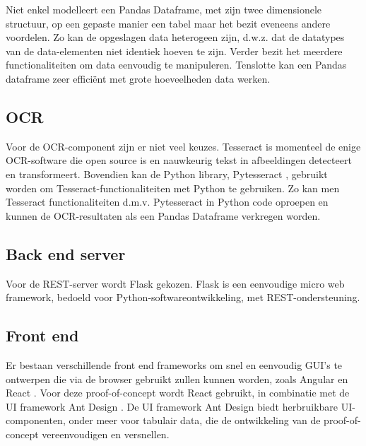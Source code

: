 Niet enkel modelleert een Pandas Dataframe, met zijn twee dimensionele structuur, op een gepaste manier een tabel maar het bezit eveneens andere voordelen. Zo kan de opgeslagen data heterogeen zijn, d.w.z. dat de datatypes van de data-elementen niet identiek hoeven te zijn. Verder bezit het meerdere functionaliteiten om data eenvoudig te manipuleren. Tenslotte kan een Pandas dataframe zeer efficiënt met grote hoeveelheden data werken.

\subsection{\Gls{OCR}}

Voor de \Gls{OCR}-component zijn er niet veel keuzes. Tesseract \autocite{Kay2007} is momenteel de enige \Gls{OCR}-software die open source is en nauwkeurig tekst in afbeeldingen detecteert en transformeert. Bovendien kan de Python library, Pytesseract \autocite{Lee2009}, gebruikt worden om Tesseract-functionaliteiten met Python te gebruiken. Zo kan men Tesseract functionaliteiten d.m.v. Pytesseract in Python code oproepen en kunnen de \Gls{OCR}-resultaten als een Pandas Dataframe verkregen worden.

\subsection{Back end server}

Voor de \Gls{REST}-server wordt Flask \autocite{Grinberg2018} gekozen. Flask is een eenvoudige micro web framework, bedoeld voor Python-softwareontwikkeling, met \Gls{REST}-ondersteuning.

\subsection{Front end}

Er bestaan verschillende front end frameworks om snel en eenvoudig GUI's te ontwerpen die via de browser gebruikt zullen kunnen worden, zoals Angular \autocite{Jain2014} en React \autocite{Fedosejev2016}. Voor deze proof-of-concept wordt React gebruikt, in combinatie met de UI framework Ant Design \autocite{Financial2020}. De UI framework Ant Design biedt herbruikbare UI-componenten, onder meer voor tabulair data, die de ontwikkeling van de proof-of-concept vereenvoudigen en versnellen.
